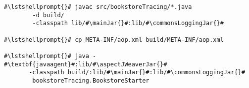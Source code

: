 \begin{lstlisting}[caption=Commands to compile and run the annotated Bookstore under \UnixLikeSystems, label=lst:traceAnalysisCompileRunExample1]
#\lstshellprompt{}# javac src/bookstoreTracing/*.java
        -d build/ 
        -classpath lib/#\mainJar{}#:lib/#\commonsLoggingJar{}#

#\lstshellprompt{}# cp META-INF/aop.xml build/META-INF/aop.xml

#\lstshellprompt{}# java -#\textbf{javaagent}#:lib/#\aspectJWeaverJar{}# 
       -classpath build/:lib/#\mainJar{}#:lib/#\commonsLoggingJar{}#
        bookstoreTracing.BookstoreStarter
\end{lstlisting}

